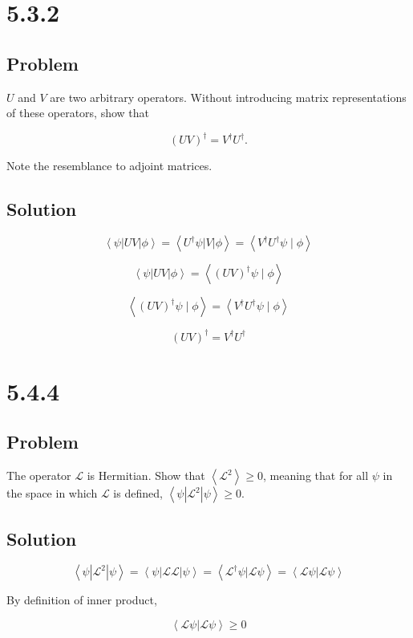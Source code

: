 \documentclass[12pt]{article}
\begin{document}
\newpage
\section{5.3.2}

\subsection{Problem}

\(U\) and \(V\) are two arbitrary operators. Without introducing matrix representations of these operators, show that

\[
    {(U V)}^{\dagger}=V^{\dagger} U^{\dagger} .
\]

Note the resemblance to adjoint matrices.

\subsection{Solution}

\[
    \left\langle\psi\left|U V\right| \phi\right\rangle
    = \left\langle U^{\dagger} \psi \left|V\right| \phi\right\rangle
    = \left\langle V^{\dagger} U^{\dagger} \psi \mid \phi\right\rangle
\]

\[
    \left\langle\psi\left|U V\right| \phi\right\rangle
    = \left\langle {\left(U V\right) }^{\dagger} \psi \mid \phi\right\rangle
\]

\[
    \left\langle {\left(U V\right) }^{\dagger} \psi \mid \phi\right\rangle
    = \left\langle V^{\dagger} U^{\dagger} \psi \mid \phi\right\rangle
\]

\[
    {\left(U V\right) }^{\dagger} = V^{\dagger} U^{\dagger}
\]

\newpage
\section{5.4.4}

\subsection{Problem}

The operator \(\mathcal{L}\) is Hermitian. Show that \(\left\langle\mathcal{L}^2\right\rangle \geq 0\), meaning that for all \(\psi \) in the space in which \(\mathcal{L}\) is defined, \(\left\langle\psi\left|\mathcal{L}^2\right| \psi\right\rangle \geq 0\).

\subsection{Solution}

\[
    \left\langle\psi\left|\mathcal{L}^2\right| \psi\right\rangle
    = \left\langle\psi\left|\mathcal{L} \mathcal{L}\right| \psi\right\rangle
    = \left\langle\mathcal{L}^\dagger \psi |\mathcal{L} \psi\right\rangle
    = \left\langle\mathcal{L} \psi |\mathcal{L} \psi\right\rangle
\]

By definition of inner product,

\[
    \left\langle\mathcal{L} \psi |\mathcal{L} \psi\right\rangle \geq 0
\]

\newpage


\nocite{El-Deeb_PEU-356_Assignments}
\end{document}
